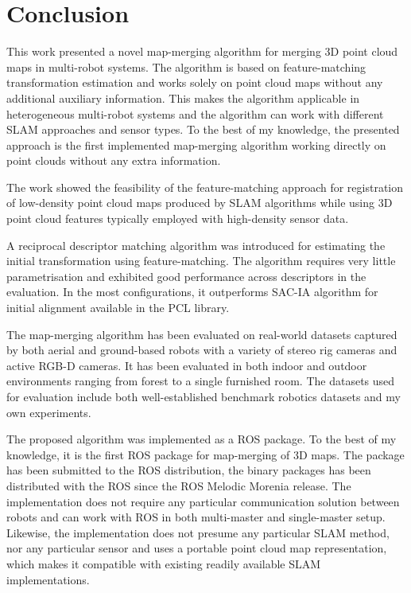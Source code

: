 \chapter*{Conclusion}

This work presented a novel map-merging algorithm for merging \gls{3D} point cloud maps in multi-robot systems. The algorithm is based on feature-matching transformation estimation and works solely on point cloud maps without any additional auxiliary information. This makes the algorithm applicable in heterogeneous multi-robot systems and the algorithm can work with different \gls{SLAM} approaches and sensor types. To the best of my knowledge, the presented approach is the first implemented map-merging algorithm working directly on point clouds without any extra information.

The work showed the feasibility of the feature-matching approach for registration of low-density point cloud maps produced by \gls{SLAM} algorithms while using \gls{3D} point cloud features typically employed with high-density sensor data.

A reciprocal descriptor matching algorithm was introduced for estimating the initial transformation using feature-matching. The algorithm requires very little parametrisation and exhibited good performance across descriptors in the evaluation. In the most configurations, it outperforms \gls{SAC-IA} algorithm for initial alignment available in the \gls{PCL} library.

The map-merging algorithm has been evaluated on real-world datasets captured by both aerial and ground-based robots with a variety of stereo rig cameras and active \gls{RGB-D} cameras. It has been evaluated in both indoor and outdoor environments ranging from forest to a single furnished room. The datasets used for evaluation include both well-established benchmark robotics datasets and my own experiments.

The proposed algorithm was implemented as a \gls{ROS} package. To the best of my knowledge, it is the first \gls{ROS} package for map-merging of \gls{3D} maps. The package has been submitted to the \gls{ROS} distribution, the binary packages has been distributed with the \gls{ROS} since the \gls{ROS} Melodic Morenia release. The implementation does not require any particular communication solution between robots and can work with \gls{ROS} in both multi-master and single-master setup. Likewise, the implementation does not presume any particular \gls{SLAM} method, nor any particular sensor and uses a portable point cloud map representation, which makes it compatible with existing readily available \gls{SLAM} implementations.

